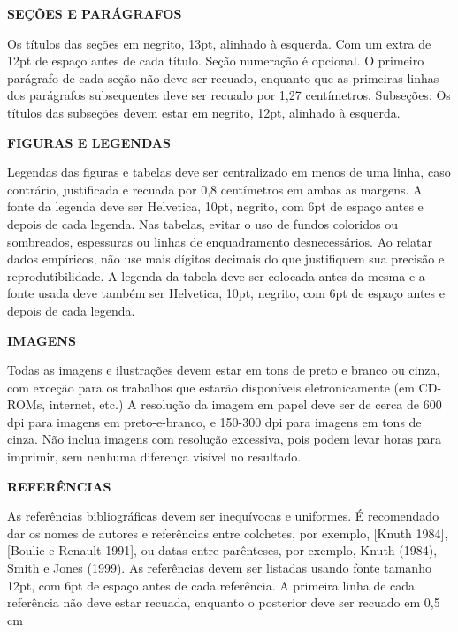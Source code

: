 \documentclass[a4paper,10pt]{article}
\begin{document}
\begin{flushleft}
\textbf{SEÇÕES E PARÁGRAFOS}
\end{flushleft}

Os títulos das seções em negrito, 13pt, alinhado à esquerda. Com um extra de 12pt de espaço antes de cada título. Seção numeração é opcional. O primeiro parágrafo de cada seção não deve ser recuado, enquanto que as primeiras linhas dos parágrafos subsequentes deve ser recuado por 1,27 centímetros. Subseções: Os títulos das subseções devem estar em negrito, 12pt, alinhado à esquerda.\\

\pagebreak

\begin{flushleft}
\textbf{FIGURAS E LEGENDAS}
\end{flushleft}

Legendas das figuras e tabelas deve ser centralizado em menos de uma linha, caso contrário, justificada e recuada por 0,8 centímetros em ambas as margens. A fonte da legenda deve ser Helvetica, 10pt, negrito, com 6pt de espaço antes e depois de cada legenda. Nas tabelas, evitar o uso de fundos coloridos ou sombreados, espessuras ou linhas de enquadramento desnecessários. Ao relatar dados empíricos, não use mais dígitos decimais do que justifiquem sua precisão e reprodutibilidade. A legenda da tabela deve ser colocada antes da mesma e a fonte usada deve também ser Helvetica, 10pt, negrito, com 6pt de espaço antes e depois de cada legenda.\\ 

\begin{flushleft}
\textbf{IMAGENS}
\end{flushleft}

Todas as imagens e ilustrações devem estar em tons de preto e branco ou cinza, com exceção para os trabalhos que estarão disponíveis eletronicamente (em CD-ROMs, internet, etc.) A resolução da imagem em papel deve ser de cerca de 600 dpi para imagens em preto-e-branco, e 150-300 dpi para imagens em tons de cinza. Não inclua imagens com resolução excessiva, pois podem levar horas para imprimir, sem nenhuma diferença visível no resultado.\\

\begin{flushleft}
\textbf{REFERÊNCIAS}
\end{flushleft}

As referências bibliográficas devem ser inequívocas e uniformes. É recomendado dar os nomes de autores e referências entre colchetes, por exemplo, [Knuth 1984], [Boulic e Renault 1991], ou datas entre parênteses, por exemplo, Knuth (1984), Smith e Jones (1999). As referências devem ser listadas usando fonte tamanho 12pt, com 6pt de espaço antes de cada referência. A primeira linha de cada referência não deve estar recuada, enquanto o posterior deve ser recuado em 0,5 cm\\

 
\end{document}
